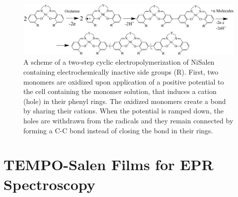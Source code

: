 \begin{figure}[!ht]
\center
	\includegraphics[width=1\textwidth]{./electrochemistry/figures/electropolymerization_reaction.pdf}
	\caption{A scheme of a two-step cyclic electropolymerization of NiSalen containing electrochemically inactive side groups (R). First, two monomers are oxidized upon application of a positive potential to the cell containing the monomer solution, that induces a cation (hole) in their phenyl rings. The oxidized monomers create a bond by sharing their cations. When the potential is ramped down, the holes are withdrawn from the radicals and they remain connected by forming a C-C bond instead of closing the bond in their rings.}
	\label{fig:electropolymerization_reaction}
\end{figure}





\section{TEMPO-Salen Films for EPR Spectroscopy}
\label{sample_fab_2}
